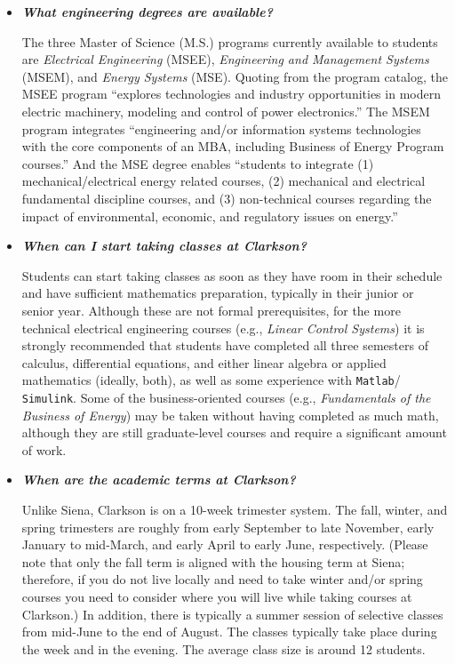 \documentclass[12pt]{article}
\begin{document}
\begin{itemize}

\item{{\bf {\em What engineering degrees are available?}}

The three Master of Science (M.S.) programs currently available to students are
{\em Electrical Engineering} (MSEE), {\em Engineering and Management Systems}
(MSEM), and {\em Energy Systems} (MSE).  Quoting from the program catalog, the
MSEE program ``explores technologies and industry opportunities in modern
electric machinery, modeling and control of power electronics.''  The MSEM
program integrates ``engineering and/or information systems technologies with
the core components of an MBA, including Business of Energy Program courses.''
And the MSE degree enables ``students to integrate (1) mechanical/electrical
energy related courses, (2) mechanical and electrical fundamental discipline
courses, and (3) non-technical courses regarding the impact of environmental,
economic, and regulatory issues on energy.''}

\item{{\bf {\em When can I start taking classes at Clarkson?}}

Students can start taking classes as soon as they have room in their schedule
and have sufficient mathematics preparation, typically in their junior or senior
year.  Although these are not formal prerequisites, for the more technical
electrical engineering courses (e.g., {\em Linear Control Systems}) it is
strongly recommended that students have completed all three semesters of
calculus, differential equations, and either linear algebra or applied
mathematics (ideally, both), as well as some experience with {\tt Matlab}/{\tt
  Simulink}.  Some of the business-oriented courses (e.g., {\em Fundamentals of
  the Business of Energy}) may be taken without having completed as much math,
although they are still graduate-level courses and require a significant amount
of work.}

\item{{\bf {\em When are the academic terms at Clarkson?}}

Unlike Siena, Clarkson is on a 10-week trimester system.  The fall, winter, and
spring trimesters are roughly from early September to late November, early
January to mid-March, and early April to early June, respectively.  (Please note
that only the fall term is aligned with the housing term at Siena; therefore, if
you do not live locally and need to take winter and/or spring courses you need
to consider where you will live while taking courses at Clarkson.)  In addition,
there is typically a summer session of selective classes from mid-June to the
end of August.  The classes typically take place during the week and in the
evening.  The average class size is around 12 students.}


\end{itemize}
\end{document}
